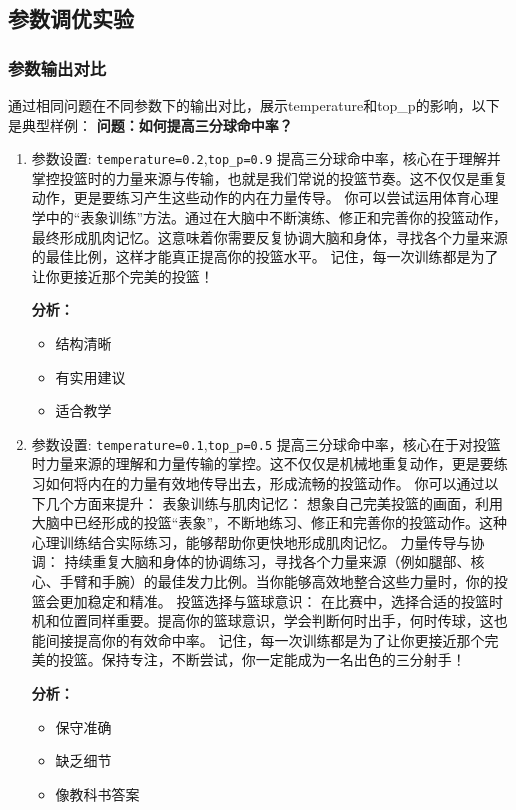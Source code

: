 \documentclass{article}
\theoremstyle{plain}
\theoremstyle{definition}
\theoremstyle{remark}
\begin{document}
\subsection{参数调优实验}

\subsubsection{参数输出对比}
通过相同问题在不同参数下的输出对比，展示temperature和top\_p的影响，以下是典型样例：
\newline
\textbf{问题：如何提高三分球命中率？}
\begin{enumerate}
  \item
  参数设置: \lstinline{temperature=0.2},\lstinline{top_p=0.9}
  提高三分球命中率，核心在于理解并掌控投篮时的力量来源与传输，也就是我们常说的投篮节奏。这不仅仅是重复动作，更是要练习产生这些动作的内在力量传导。
  你可以尝试运用体育心理学中的“表象训练”方法。通过在大脑中不断演练、修正和完善你的投篮动作，最终形成肌肉记忆。这意味着你需要反复协调大脑和身体，寻找各个力量来源的最佳比例，这样才能真正提高你的投篮水平。
  记住，每一次训练都是为了让你更接近那个完美的投篮！
  
  \textbf{分析：}
  \begin{itemize}
    \item 结构清晰
    \item 有实用建议
    \item 适合教学
  \end{itemize}


  \item
  参数设置: \lstinline{temperature=0.1},\lstinline{top_p=0.5}
  提高三分球命中率，核心在于对投篮时力量来源的理解和力量传输的掌控。这不仅仅是机械地重复动作，更是要练习如何将内在的力量有效地传导出去，形成流畅的投篮动作。
  你可以通过以下几个方面来提升：
  表象训练与肌肉记忆： 想象自己完美投篮的画面，利用大脑中已经形成的投篮“表象”，不断地练习、修正和完善你的投篮动作。这种心理训练结合实际练习，能够帮助你更快地形成肌肉记忆。
  力量传导与协调： 持续重复大脑和身体的协调练习，寻找各个力量来源（例如腿部、核心、手臂和手腕）的最佳发力比例。当你能够高效地整合这些力量时，你的投篮会更加稳定和精准。
  投篮选择与篮球意识： 在比赛中，选择合适的投篮时机和位置同样重要。提高你的篮球意识，学会判断何时出手，何时传球，这也能间接提高你的有效命中率。
  记住，每一次训练都是为了让你更接近那个完美的投篮。保持专注，不断尝试，你一定能成为一名出色的三分射手！
  
  \textbf{分析：}
  \begin{itemize}
    \item 保守准确
    \item 缺乏细节
    \item 像教科书答案
  \end{itemize}



\end{enumerate}
\end{document}
